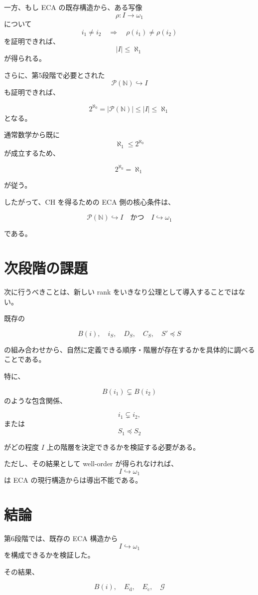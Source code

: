\documentclass[a4paper,11pt]{article}
\begin{document}
一方、もし ECA の既存構造から、ある写像
\[
\rho:I\to\omega_1
\]
について
\[
i_1\neq i_2
\quad\Longrightarrow\quad
\rho(i_1)\neq\rho(i_2)
\]
を証明できれば、
\[
|I|\leq\aleph_1
\]
が得られる。

さらに、第5段階で必要とされた
\[
\mathcal{P}(\mathbb{N})\hookrightarrow I
\]
も証明できれば、

\[
2^{\aleph_0}
=
|\mathcal{P}(\mathbb{N})|
\leq
|I|
\leq
\aleph_1
\]
となる。

通常数学から既に
\[
\aleph_1\leq2^{\aleph_0}
\]
が成立するため、

\[
\boxed{
2^{\aleph_0}=\aleph_1
}
\]

が従う。

したがって、CH を得るための ECA 側の核心条件は、

\[
\boxed{
\mathcal{P}(\mathbb{N})\hookrightarrow I
\quad\text{かつ}\quad
I\hookrightarrow\omega_1
}
\]

である。

\section{次段階の課題}

次に行うべきことは、新しい rank をいきなり公理として導入することではない。

既存の

\[
B(i),\quad
i_S,\quad
D_S,\quad
C_S,\quad
S'\preceq S
\]

の組み合わせから、自然に定義できる順序・階層が存在するかを具体的に調べることである。

特に、

\[
B(i_1)\subsetneq B(i_2)
\]
のような包含関係、

\[
i_1\subsetneq i_2,
\]
または
\[
S_1\preceq S_2
\]

がどの程度 $I$ 上の階層を決定できるかを検証する必要がある。

ただし、その結果として well-order が得られなければ、
\[
I\hookrightarrow\omega_1
\]
は ECA の現行構造からは導出不能である。

\section{結論}

第6段階では、既存の ECA 構造から
\[
I\hookrightarrow\omega_1
\]
を構成できるかを検証した。

その結果、

\[
B(i),\quad
E_{\mathrm{d}},\quad
E_{\mathrm{c}},\quad
\mathcal{G}
\]
\end{document}
